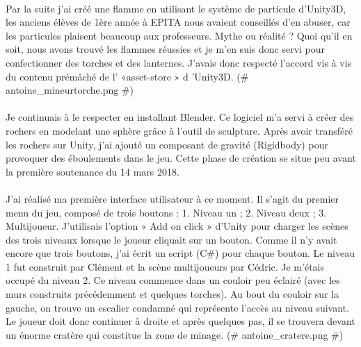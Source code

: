 \documentclass[titlepage, 13px, a4paper]{report}
\begin{document}
\paragraph{} \hspace{0pt} 
Par la suite j'ai créé une flamme en utilisant le système de particule d'Unity3D, les
anciens élèves de 1ère année à EPITA nous avaient conseillés d'en abuser, car les
particules plaisent beaucoup aux professeurs. Mythe ou réalité ? Quoi qu'il en soit,
nous avons trouvé les flammes réussies et je m'en suis donc servi pour
confectionner des torches et des lanternes. J'avais donc respecté l'accord vis à vis
du contenu prémâché de l' «asset-store » d 'Unity3D. \@(\# antoine\_mineurtorche.png \#)\@ \\


\paragraph{} \hspace{0pt} 
Je continuais à le respecter en installant Blender. Ce logiciel m'a servi à créer des
rochers en modelant une sphère grâce à l'outil de sculpture. Après avoir transféré
les rochers sur Unity, j'ai ajouté un composant de gravité (Rigidbody) pour provoquer des
éboulements dans le jeu. Cette phase de création se situe peu avant la première
soutenance du 14 mars 2018. \\


\paragraph{} \hspace{0pt} 
J'ai réalisé ma première interface utilisateur à ce moment. Il s'agit du premier menu
du jeu, composé de trois boutons : 1. Niveau un ; 2. Niveau deux ; 3. Multijoueur.
J'utilisais l'option « Add on click » d'Unity pour charger les scènes des trois niveaux
lorsque le joueur cliquait sur un bouton. Comme il n'y avait encore que trois
boutons, j'ai écrit un script (C\#) pour chaque bouton. Le niveau 1 fut construit par
Clément et la scène multijoueurs par Cédric. Je m'étais occupé du niveau 2. Ce
niveau commence dans un couloir peu éclairé (avec les murs construits
précédemment et quelques torches). Au bout du couloir sur la gauche, on trouve un
escalier condamné qui représente l'accès au niveau suivant. Le joueur doit donc
continuer à droite et après quelques pas, il se trouvera devant un énorme cratère
qui constitue la zone de minage. \@(\# antoine\_cratere.png \#)\@   \\
\end{document}
